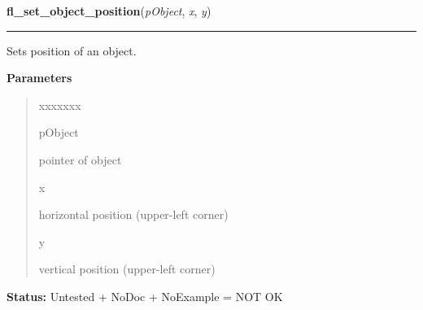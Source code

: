 \hspace{.8\funcindent}\begin{boxedminipage}{\funcwidth}

    \raggedright \textbf{fl\_set\_object\_position}(\textit{pObject}, \textit{x}, \textit{y})

    \vspace{-1.5ex}

    \rule{\textwidth}{0.5\fboxrule}
\setlength{\parskip}{2ex}
    Sets position of an object.

\setlength{\parskip}{1ex}
      \textbf{Parameters}
      \vspace{-1ex}

      \begin{quote}
        \begin{Ventry}{xxxxxxx}

          \item[pObject]

          pointer of object

          \item[x]

          horizontal position (upper-left corner)

          \item[y]

          vertical position (upper-left corner)

        \end{Ventry}

      \end{quote}

\textbf{Status:} Untested + NoDoc + NoExample = NOT OK



    \end{boxedminipage}

    \label{xformslib:library:fl_get_object_size}

    \vspace{0.5ex}

